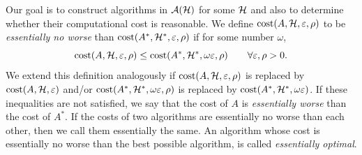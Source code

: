 \documentclass[graybox,footinfo]{svmult}
\begin{document}
Our goal is to construct algorithms in ${\mathcal{A}}({\mathcal{H}})$ for some ${\mathcal{H}}$ and also to determine whether their computational cost is reasonable.  We define  $\textup{cost}(A,{\mathcal{H}},\varepsilon,\rho)$ to be \emph{essentially no worse} than $\textup{cost}(A^*,{\mathcal{H}}^*,\varepsilon,\rho)$ if for some number $\omega$,
\begin{equation} \label{essNoWorseDef}
    \textup{cost}(A,\calH,\varepsilon,\rho)
    \le 
    \textup{cost}(A^*,\calH^*,\omega\varepsilon,\rho)
    \qquad \forall \varepsilon,\rho > 0.
\end{equation}
We extend this definition analogously if $\textup{cost}(A,{\mathcal{H}},\varepsilon,\rho)$ is replaced by $\textup{cost}(A,{\mathcal{H}},\varepsilon)$ and/or $\textup{cost}(A^*,{\mathcal{H}}^*,\omega\varepsilon,\rho)$ is replaced by $\textup{cost}(A^*,{\mathcal{H}}^*,\omega\varepsilon)$.
If these inequalities are not satisfied, we say that the cost of  $A$ is \emph{essentially worse}  than the cost of $A^*$.
If the costs of two algorithms are essentially no worse than each other, then we call them essentially the same.  An algorithm whose cost is essentially no worse than the best possible algorithm, is called \emph{essentially optimal}.
\end{document}
